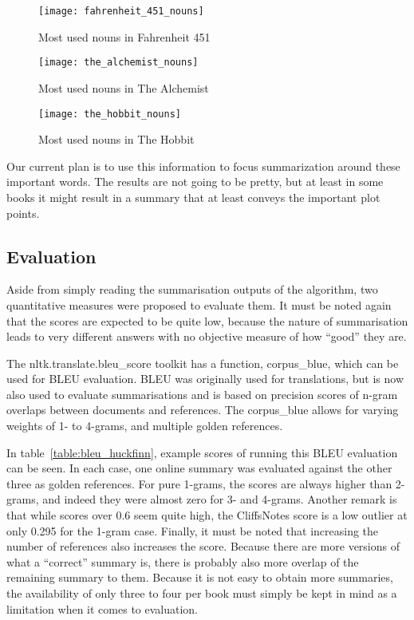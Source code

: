 \begin{figure}[H]
	\centering
	\texttt{[image: fahrenheit\_451\_nouns]}
	\caption{Most used nouns in Fahrenheit 451}\label{fig:fahrenheit_451_nouns}
\end{figure}

\begin{figure}[H]
	\centering
	\texttt{[image: the\_alchemist\_nouns]}
	\caption{Most used nouns in The Alchemist}\label{fig:the_alchemist_nouns}
\end{figure}

\begin{figure}[H]
	\centering
	\texttt{[image: the\_hobbit\_nouns]}
	\caption{Most used nouns in The Hobbit}\label{fig:the_hobbit_nouns}
\end{figure}

Our current plan is to use this information to focus summarization around these
important words. The results are not going to be pretty, but at least in some
books it might result in a summary that at least conveys the important plot
points.

\subsection{Evaluation}
Aside from simply reading the summarisation outputs of the algorithm, two
quantitative measures were proposed to evaluate them. It must be noted again
that the scores are expected to be quite low, because the nature of
summarisation leads to very different answers with no objective measure of how
``good'' they are. 

The nltk.translate.bleu\_score toolkit has a function, corpus\_blue, which can
be used for BLEU evaluation. BLEU was originally used for translations, but is
now also used to evaluate summarisations and is based on precision scores of
n-gram overlaps between documents and references. The corpus\_blue allows for
varying weights of 1- to 4-grams, and multiple golden references. 

In table~\ref{table:bleu_huckfinn}, example scores of running this BLEU
evaluation can be seen. In each case, one online summary was evaluated against
the other three as golden references. For pure 1-grams, the scores are always
higher than 2-grams, and indeed they were almost zero for 3- and 4-grams.
Another remark is that while scores over 0.6 seem quite high, the CliffsNotes
score is a low outlier at only 0.295 for the 1-gram case. Finally, it must be
noted that increasing the number of references also increases the score.
Because there are more versions of what a ``correct'' summary is, there is
probably also more overlap of the remaining summary to them. Because it is not
easy to obtain more summaries, the availability of only three to four per book
must simply be kept in mind as a limitation when it comes to evaluation.

